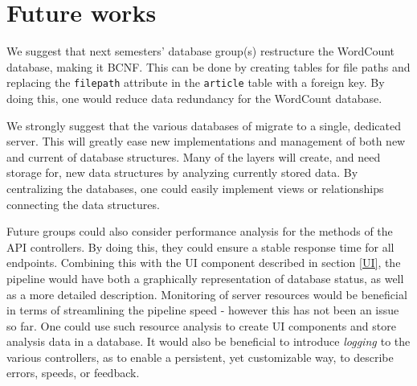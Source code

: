 \section{Future works}
We suggest that next semesters' database group(s) restructure the WordCount database, making it BCNF. 
This can be done by creating tables for file paths and replacing the \texttt{filepath} attribute in the \texttt{article} table with a foreign key.
By doing this, one would reduce data redundancy for the WordCount database. 

We strongly suggest that the various databases of \knox{} migrate to a single, dedicated server.
This will greatly ease new implementations and management of both new and current of database structures.
Many of the layers will create, and need storage for, new data structures by analyzing currently stored data.
By centralizing the \knox{} databases, one could easily implement views or relationships connecting the data structures.

Future groups could also consider performance analysis for the methods of the API controllers. 
By doing this, they could ensure a stable response time for all endpoints.
Combining this with the UI component described in section \ref{UI}, the pipeline would have both a graphically representation of database status, as well as a more detailed description.
Monitoring of server resources would be beneficial in terms of streamlining the pipeline speed - however this has not been an issue so far.
One could use such resource analysis to create UI components and store analysis data in a database. 
It would also be beneficial to introduce \textit{logging \cite{ASPLogging}} to the various controllers, as to enable a persistent, yet customizable way, to describe errors, speeds, or feedback.
